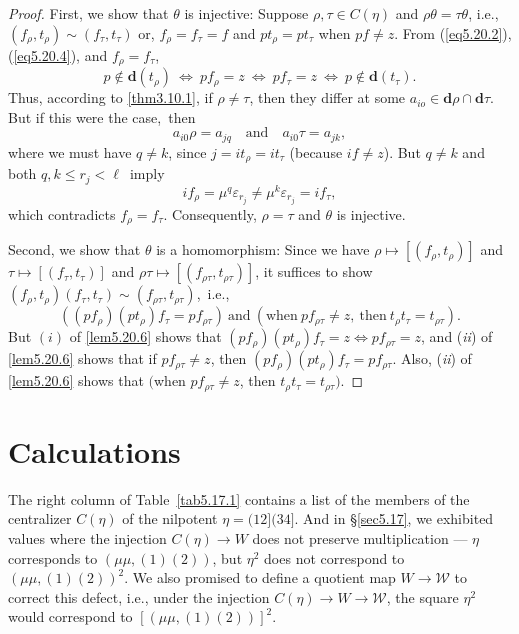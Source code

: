 \documentclass{surv-l}
\numberwithin{equation}{section}
\numberwithin{table}{section}
\numberwithin{figure}{section}
\theoremstyle{plain}
\theoremstyle{definition}
\begin{document}
\begin{proof}
First, we show that $\theta$ is injective: Suppose $\rho, \tau\in
C(\eta)$ and $\rho\theta=\tau\theta$, i.e.,
$(f_{\rho},t_{\rho})\sim(f_{\tau}, t_{\tau})$ or,
$f_{\rho}=f_{\tau}=f$ and $pt_{\rho}=pt_{\tau}$ when $pf\neq z$.
From (\ref{eq5.20.2}), (\ref{eq5.20.4}), and $f_{\rho}=f_{\tau}$,
\[
p\not\in \mathbf{d}(t_{\rho})\ \Leftrightarrow\ pf_{\rho}=z\ \Leftrightarrow\ pf_{\tau}
=z\ \Leftrightarrow\ p\not\in \mathbf{d}(t_{\tau}).
\]
Thus, according to \ref{thm3.10.1}, if $\rho\neq\tau$, then they
differ at some $ a_{io}\in \mathbf{d}\rho\cap \mathbf{d}\tau$. But
if this were the case,~then
\[
a_{i0}\rho=a_{jq}\quad \mathrm{and}\quad a_{i0}\tau=a_{jk},
\]
where we must have $q\neq k$, since $j=it_{\rho}=it_{\tau}$
(because $if\neq z$). But $q\neq k$ and both $q,  k\leq
r_{j}<\ell$~imply
\[
if_{\rho}=\mu^{q}\varepsilon_{r_{j}}\neq\mu^{k}\varepsilon_{r_{j}}=if_{\tau},
\]
which contradicts $f_{\rho}=f_{\tau}$. Consequently, $\rho=\tau$
and $\theta$ is injective.

\noindent Second, we show that $\theta$ is a homomorphism: Since
we have $\rho\mapsto[(f_{\rho}, t_{\rho})]$ and
$\tau\mapsto[(f_{\tau}, t_{\tau})]$ and
$\rho\tau\mapsto[(f_{\rho\tau}, t_{\rho\tau})]$, it suffices to
show $(f_{\rho}, t_{\rho})(f_{\tau}, t_{\tau})\sim (f_{\rho\tau},
t_{\rho\tau})$,~i.e.,
\[
((pf_{\rho})(pt_{\rho})f_{\tau}=pf_{\rho\tau})\ \mathrm{and}\ (\mathrm{when}\
pf_{\rho\tau}\neq z,\ \mathrm{then}\ t_{\rho}t_{\tau}=t_{\rho\tau}).
\]
But $(i)$ of \ref{lem5.20.6} shows that
$(pf_{\rho})(pt_{\rho})f_{\tau}=z\Leftrightarrow pf_{\rho\tau}=z$,
and (\emph{ii}) of \ref{lem5.20.6} shows that if
$pf_{\rho\tau}\neq z$, then
$(pf_{\rho})(pt_{\rho})f_{\tau}=pf_{\rho\tau}$. Also, (\emph{ii})
of \ref{lem5.20.6} shows that $($when $pf_{\rho\tau}\neq z$, then
$t_{\rho}t_{\tau}=t_{\rho\tau}).$
\end{proof}

\section{Calculations}\label{sec5.21}

The right column of Table~\ref{tab5.17.1} contains a list of the
members of the centralizer $C(\eta)$ of the nilpotent
$\eta=(12](34]$. And in \S\ref{sec5.17}, we exhibited values where
the injection $C(\eta)\rightarrow W$ does not preserve
multiplication --- $\eta$ corresponds to $(\mu\mu, (1)(2))$, but
$\eta^{2}$ does not correspond to $(\mu\mu,(1)(2))^{2}$. We also
promised to define a quotient map $W\rightarrow \mathcal{W}$ to
correct this defect, i.e., under the injection $C(\eta)\rightarrow
W\rightarrow \mathcal{W}$, the square $\eta^{2}$ would correspond
to $\left[\left(\mu\mu,(1)(2)\right)\right]^{2}$.
\end{document}
